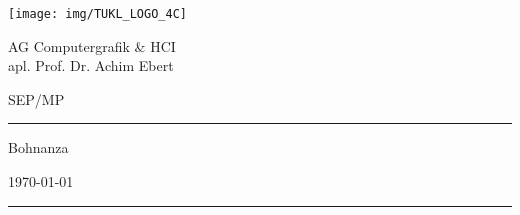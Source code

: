\thispagestyle{empty}
	\newcommand{\Rule}{\rule{\textwidth}{0.5mm}}
	\begin{center}
	{\Large \texttt{[image: img/TUKL\_LOGO\_4C]} \par}

	\vspace{0.5em}

	{\Large AG Computergrafik \& HCI \\ apl. Prof. Dr. Achim Ebert \par}

	\vspace{0.5em}

	{\Large SEP/MP \the\year \par}


	\vspace{5cm}

	\Rule

	\vspace{1cm}

	{\Huge Bohnanza \par}

	\vspace{0.5em}

	{\Large \mysubject \par}

	\vspace{0.5em}

	{\small \today \par}

	\vspace{0.7cm}

	\Rule


	\vfill %


	\emph{\textbf{\mygroup}} \\[1em]
	\myauthor

	\end{center}
